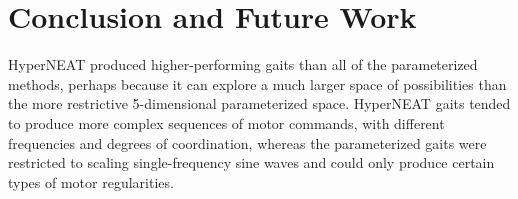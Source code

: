 \section{Conclusion and Future Work}

%
%

HyperNEAT produced higher-performing gaits than all of the
parameterized methods, perhaps
because it can explore a much larger space of possibilities than the more
restrictive 5-dimensional parameterized space.  HyperNEAT gaits tended
to produce more complex sequences of motor commands, with different
frequencies and degrees of coordination, whereas the parameterized
gaits were restricted to scaling single-frequency sine waves and could
only produce certain types of motor regularities.
